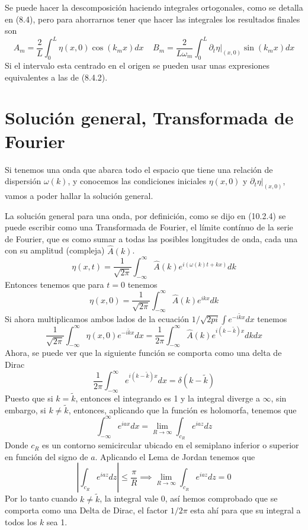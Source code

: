 Se puede hacer la descomposición haciendo integrales ortogonales, como se detalla en (8.4), pero para ahorrarnos tener que hacer las integrales los resultados finales son
\begin{equation} \label{6.1.1}
    A_m = \frac{2}{L}\int_{0}^{L} \eta(x,0)\cos(k_m x)dx \ \ \ \ \ B_m = \frac{2}{L \omega_m}\int_{0}^{L} \partial_t \eta |_{(x,0)}\sin(k_m x)dx
\end{equation}
Si el intervalo esta centrado en el origen se pueden usar unas expresiones equivalentes a las de (8.4.2).
\section{Solución general, Transformada de Fourier}
Si tenemos una onda que abarca todo el espacio que tiene una relación de dispersión $\omega(k)$, y conocemos las condiciones iniciales $\eta(x,0)$ y $\partial_t \eta |_{(x,0)}$, vamos a poder hallar la solución general.

La solución general para una onda, por definición, como se dijo en (10.2.4) se puede escribir como una Transformada de Fourier, el límite contínuo de la serie de Fourier, que es como sumar a todas las posibles longitudes de onda, cada una con su amplitud (compleja) $\hat{A}(k)$.
\begin{equation} \label{6.1.1}
    \eta(x,t) = \frac{1}{\sqrt{2\pi}} \int_{-\infty}^\infty \hat{A}(k) e^{i(\omega(k)t + kx)}dk
\end{equation}
Entonces tenemos que para $t=0$ tenemos
\begin{equation} \label{6.1.1}
    \eta(x,0) = \frac{1}{\sqrt{2\pi}} \int_{-\infty}^\infty \hat{A}(k) e^{ikx}dk
\end{equation}
Si ahora multiplicamos ambos lados de la ecuación $1/\sqrt{2pi} \int e^{-i\tilde{k}x} dx$ tenemos
\[\frac{1}{\sqrt{2\pi}}\int_{-\infty}^\infty \eta(x,0) e^{-i\tilde{k}x}dx = \frac{1}{2\pi} \int_{-\infty}^\infty \hat{A}(k) e^{i(k-\tilde{k})x}dkdx\]
\newpage
Ahora, se puede ver que la siguiente función se comporta como una delta de Dirac
\begin{equation} \label{6.1.1}
    \frac{1}{2\pi} \int_{-\infty}^\infty e^{i(k-\tilde{k})x}dx = \delta(k-\tilde{k})
\end{equation}
Puesto que si $k = \tilde{k}$, entonces el integrando es 1 y la integral diverge a $\infty$, sin embargo, si $k \neq \tilde{k}$, entonces, aplicando que la función es holomorfa, tenemos que 
\[\int_{-\infty}^\infty e^{iax}dx = \lim_{R\rightarrow \infty }\int_{c_R} e^{iaz} dz\]
Donde $c_R$ es un contorno semicircular ubicado en el semiplano inferior o superior en función del signo de $a$. Aplicando el Lema de Jordan tenemos que
\[\left|\int_{c_R} e^{iaz} dz\right| \leq \frac{\pi}{R} \implies \lim_{R\rightarrow \infty }\int_{c_R} e^{iaz} dz = 0\]
Por lo tanto cuando $k \neq \tilde{k}$, la integral vale 0, así hemos comprobado que se comporta como una Delta de Dirac, el factor $1/2\pi$ esta ahí para que su integral a todos los $k$ sea 1.

